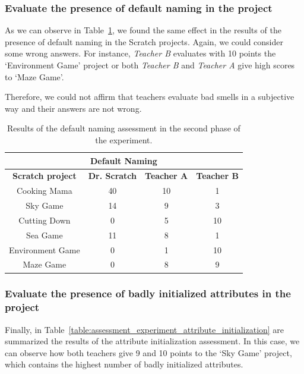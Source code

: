 \subsubsection{Evaluate the presence of default naming in the project}
\label{subsubsec:default_naming_experiment}

As we can observe in Table~\ref{table:assessment_experiment_default_naming}, we found the same effect in the results of the presence of default naming in the Scratch projects. Again, we could consider some wrong answers. For instance, \textit{Teacher B} evaluates with 10 points the `Environment Game' project or both \textit{Teacher B} and \textit{Teacher A} give high scores to `Maze Game'. 

Therefore, we could not affirm that teachers evaluate bad smells in a subjective way and their answers are not wrong.  

\begin{table}
    \centering
    \begin{tabular}{|c|c|c|c|}
        \hline
        \multicolumn{4}{|c|}{\textbf{Default Naming}} \\ \hline
        \textbf{Scratch project} & \textbf{Dr. Scratch} & \textbf{Teacher A} & \textbf{Teacher B} \\ \hline
        Cooking Mama  & 40 & 10 & 1  \\ \hline
        Sky Game & 14 & 9 & 3 \\ \hline
        Cutting Down  & 0 & 5 & 10  \\ \hline
        Sea Game  & 11 & 8 & 1  \\ \hline
        Environment Game  & 0 & 1 & 10  \\ \hline
        Maze Game  & 0 & 8 & 9  \\ \hline
    \end{tabular}
    \caption{Results of the default naming assessment in the second phase of the experiment.}
    \label{table:assessment_experiment_default_naming}
\end{table}


\subsubsection{Evaluate the presence of badly initialized attributes in the project}
\label{subsubsec:attribute_initialization_experiment}

Finally, in Table~\ref{table:assessment_experiment_attribute_initialization} are summarized the results of the attribute initialization assessment. In this case, we can observe how both teachers give 9 and 10 points to the `Sky Game' project, which contains the highest number of badly initialized attributes.

